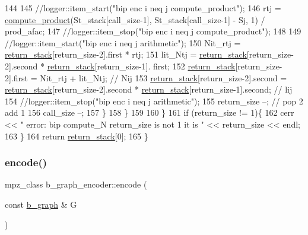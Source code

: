 \begin{DoxyCode}
144 
145         \textcolor{comment}{//logger::item\_start("bip enc i neq j compute\_product");}
146         rtj = \hyperlink{compression__helper_8cpp_ae2afb43aabe50f7d42aae8f82b5a35f4}{compute\_product}(St\_stack[call\_size-1], St\_stack[call\_size-1] - Sj, 1) / 
      prod\_afac;
147         \textcolor{comment}{//logger::item\_stop("bip enc i neq j compute\_product");}
148 
149         \textcolor{comment}{//logger::item\_start("bip enc i neq j arithmetic");}
150         Nit\_rtj = \hyperlink{namespacehelper__vars_a6d2100c373830cacd232319a9958652d}{return\_stack}[return\_size-2].first * rtj;
151         lit\_Ntj = \hyperlink{namespacehelper__vars_a6d2100c373830cacd232319a9958652d}{return\_stack}[return\_size-2].second * \hyperlink{namespacehelper__vars_a6d2100c373830cacd232319a9958652d}{return\_stack}[return\_size-1].
      first;
152         \hyperlink{namespacehelper__vars_a6d2100c373830cacd232319a9958652d}{return\_stack}[return\_size-2].first = Nit\_rtj + lit\_Ntj; \textcolor{comment}{// Nij}
153         \hyperlink{namespacehelper__vars_a6d2100c373830cacd232319a9958652d}{return\_stack}[return\_size-2].second = \hyperlink{namespacehelper__vars_a6d2100c373830cacd232319a9958652d}{return\_stack}[return\_size-2].second * 
      \hyperlink{namespacehelper__vars_a6d2100c373830cacd232319a9958652d}{return\_stack}[return\_size-1].second; \textcolor{comment}{// lij}
154         \textcolor{comment}{//logger::item\_stop("bip enc i neq j arithmetic");}
155         return\_size --; \textcolor{comment}{// pop 2 add 1}
156         call\_size --;
157       \}
158     \}
159 
160   \}
161   \textcolor{keywordflow}{if} (return\_size != 1)\{
162     cerr << \textcolor{stringliteral}{" error: bip compute\_N return\_size is not 1 it is "} << return\_size << endl;
163   \}
164   \textcolor{keywordflow}{return} \hyperlink{namespacehelper__vars_a6d2100c373830cacd232319a9958652d}{return\_stack}[0];
165 \}
\end{DoxyCode}
\mbox{\label{classb__graph__encoder_a9dbf40f42a2eb12822b14ca10d580763}} 
\subsubsection{\texorpdfstring{encode()}{encode()}}
{\footnotesize\ttfamily mpz\+\_\+class b\+\_\+graph\+\_\+encoder\+::encode (\begin{DoxyParamCaption}\item[{const \hyperlink{classb__graph}{b\+\_\+graph} \&}]{G }\end{DoxyParamCaption})}



